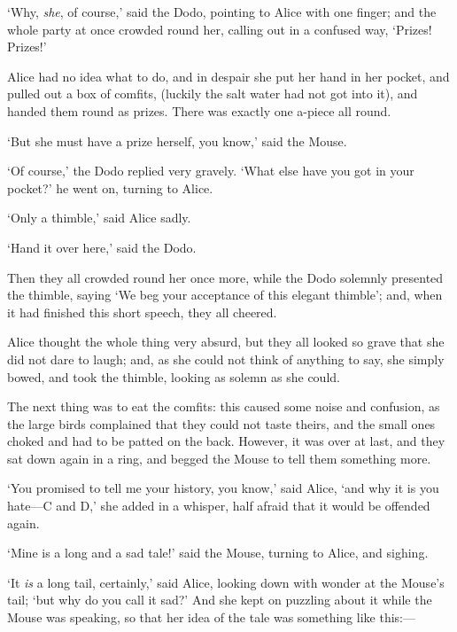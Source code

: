 \documentclass[12pt,openany]{memoir}
\begin{document}
`Why, \textit{she}, of course,' said the Dodo, pointing to Alice with one finger; and the whole party at once crowded round her, calling out in a confused way, `Prizes! Prizes!'

Alice had no idea what to do, and in despair she put her hand in her pocket, and pulled out a box of comfits, (luckily the salt water had not got into it), and handed them round as prizes. There was exactly one a-piece all round.

`But she must have a prize herself, you know,' said the Mouse.

`Of course,' the Dodo replied very gravely. `What else have you got in your pocket?' he went on, turning to Alice.

`Only a thimble,' said Alice sadly.

`Hand it over here,' said the Dodo.

Then they all crowded round her once more, while the Dodo solemnly presented the thimble, saying `We beg your acceptance of this elegant thimble'; and, when it had finished this short speech, they all cheered.

Alice thought the whole thing very absurd, but they all looked so grave that she did not dare to laugh; and, as she could not think of anything to say, she simply bowed, and took the thimble, looking as solemn as she could.

The next thing was to eat the comfits: this caused some noise and confusion, as the large birds complained that they could not taste theirs, and the small ones choked and had to be patted on the back. However, it was over at last, and they sat down again in a ring, and begged the Mouse to tell them something more.

`You promised to tell me your history, you know,' said Alice, `and why it is you hate---C and D,' she added in a whisper, half afraid that it would be offended again.

`Mine is a long and a sad tale!' said the Mouse, turning to Alice, and sighing.

`It \textit{is} a long tail, certainly,' said Alice, looking down with wonder at the Mouse's tail; `but why do you call it sad?' And she kept on puzzling about it while the Mouse was speaking, so that her idea of the tale was something like this:---

\newpage
\end{document}
